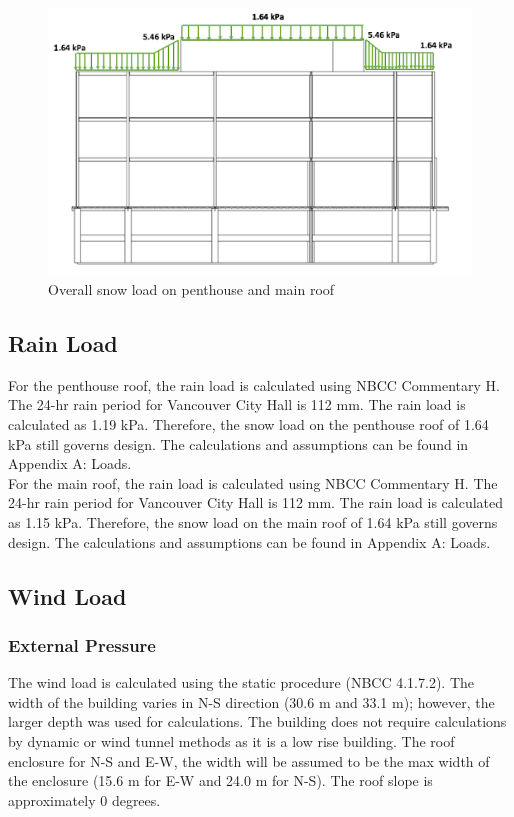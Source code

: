 \documentclass[12pt]{article}
\begin{document}
\begin{figure}[h!]
    \includegraphics[width=\linewidth]{Assets/snowdist.png}
    \caption{Overall snow load on penthouse and main roof}
    \label{fig:snowdist}
\end{figure}

\subsection{Rain Load}
For the penthouse roof, the rain load is calculated using NBCC Commentary H.
The 24-hr rain period for Vancouver City Hall is 112 mm.
The rain load is calculated as 1.19 kPa.
Therefore, the snow load on the penthouse roof of 1.64 kPa still governs design.
The calculations and assumptions can be found in Appendix A: Loads.\\

For the main roof, the rain load is calculated using NBCC Commentary H.
The 24-hr rain period for Vancouver City Hall is 112 mm.
The rain load is calculated as 1.15 kPa.
Therefore, the snow load on the main roof of 1.64 kPa still governs design.
The calculations and assumptions can be found in Appendix A: Loads.
\subsection{Wind Load}
\subsubsection{External Pressure}
The wind load is calculated using the static procedure (NBCC 4.1.7.2). The width of the building varies in N-S direction (30.6 m and 33.1 m); however, the larger depth was used for calculations. The building does not require calculations by dynamic or wind tunnel methods as it is a low rise building. The roof enclosure for N-S and E-W, the width will be assumed to be the max width of the enclosure (15.6 m for E-W and 24.0 m for N-S). The roof slope is approximately 0 degrees.\\
\end{document}
